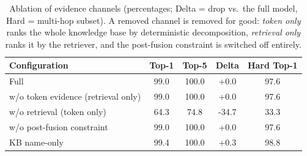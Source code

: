 \begin{table}[t]
\caption{Ablation of evidence channels (percentages; Delta = drop vs.\ the full model, Hard = multi-hop subset). A removed channel is removed for good: \emph{token only} ranks the whole knowledge base by deterministic decomposition, \emph{retrieval only} ranks it by the retriever, and the post-fusion constraint is switched off entirely.}
\label{tab:ablation}
\centering
\footnotesize
\setlength{\tabcolsep}{3.5pt}
\begin{tabular}{lcccc}
\toprule
Configuration & Top-1 & Top-5 & Delta & Hard Top-1 \\
\midrule
Full & 99.0 & 100.0 & +0.0 & 97.6 \\
w/o token evidence (retrieval only) & 99.0 & 100.0 & +0.0 & 97.6 \\
w/o retrieval (token only) & 64.3 & 74.8 & -34.7 & 33.3 \\
w/o post-fusion constraint & 99.0 & 100.0 & +0.0 & 97.6 \\
KB name-only & 99.4 & 100.0 & +0.3 & 98.8 \\
\bottomrule
\end{tabular}
\end{table}
